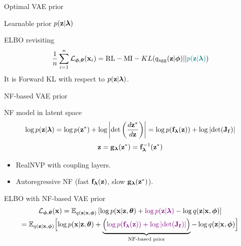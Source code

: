 \begin{frame}{Optimal VAE prior}
\begin{minipage}[t]{0.5\columnwidth}
\begin{block}{Learnable prior $p(\mathbf{z} | \boldsymbol{\lambda})$}
\begin{figure}[h]
			\end{figure}
		\end{block}
	\end{minipage}
	\vspace{-0.4cm}
	\begin{block}{ELBO revisiting}
		\vspace{-0.3cm}
		\[
		\frac{1}{n}\sum_{i=1}^n \mathcal{L}_{\boldsymbol{\phi}, \boldsymbol{\theta}}(\mathbf{x}_i) = \text{RL} - \text{MI} -  KL(q_{\text{agg}}(\mathbf{z} | \boldsymbol{\phi}) || {\color{teal}p(\mathbf{z} | \boldsymbol{\lambda})})
		\]
		It is Forward KL with respect to $p(\mathbf{z} | \boldsymbol{\lambda})$.
	\end{block}
\end{frame}
\begin{frame}{NF-based VAE prior}
	\begin{block}{NF model in latent space}
		\vspace{-0.5cm}
		\[
		\log p(\mathbf{z} | \boldsymbol{\lambda}) = \log p(\mathbf{z}^*) + \log  \left | \det \left(\frac{d \mathbf{z}^*}{d\mathbf{z}}\right)\right| = \log p(\mathbf{f}_{\boldsymbol{\lambda}}(\mathbf{z})) + \log \left | \det (\mathbf{J}_{\mathbf{f}})\right| 
		\]
		\vspace{-0.3cm}
		\[
		\mathbf{z} = \mathbf{g}_{\boldsymbol{\lambda}}(\mathbf{z}^*) = \mathbf{f}^{-1}_{\boldsymbol{\lambda}}(\mathbf{z}^*)
		\]
	\end{block}
	\vspace{-0.3cm}
	\begin{itemize}
		\item RealNVP with coupling layers.
		\item Autoregressive NF (fast $\mathbf{f}_{\boldsymbol{\lambda}}(\mathbf{z})$, slow $\mathbf{g}_{\boldsymbol{\lambda}}(\mathbf{z}^*)$).
	\end{itemize}
	\begin{block}{ELBO with NF-based VAE prior}
		\vspace{-0.5cm}
		{\small
			\begin{multline*}
				\mathcal{L}_{\boldsymbol{\phi}, \boldsymbol{\theta}}(\mathbf{x}) = \mathbb{E}_{q(\mathbf{z} | \mathbf{x}, \boldsymbol{\phi})} \left[ \log p(\mathbf{x} | \mathbf{z}, \boldsymbol{\theta}) + {\color{violet}\log p(\mathbf{z} | \boldsymbol{\lambda})} - \log q(\mathbf{z} | \mathbf{x}, \boldsymbol{\phi}) \right] \\
				= \mathbb{E}_{q(\mathbf{z} | \mathbf{x}, \boldsymbol{\phi})} \Bigl[ \log p(\mathbf{x} | \mathbf{z}, \boldsymbol{\theta}) + \underbrace{ \Bigl({\color{violet} \log p(\mathbf{f}_{\boldsymbol{\lambda}}(\mathbf{z})) + \log \left| \det (\mathbf{J}_{\mathbf{f}}) \right|} \Bigr) }_{\text{NF-based prior}} - \log q(\mathbf{z} | \mathbf{x}, \boldsymbol{\phi}) \Bigr] 
			\end{multline*}
		}
	\end{block}
\end{frame}
